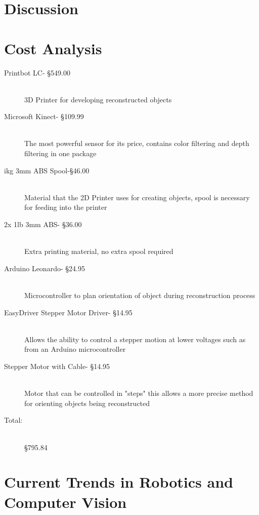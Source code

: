 \documentclass[12pt,twocolumn]{article}
\begin{document}
\section{Discussion}


\section{Cost Analysis}
  \begin{description}
  \item[Printbot LC- \S 549.00] \hfill \\
  3D Printer for developing reconstructed objects
  \item[Microsoft Kinect- \S 109.99] \hfill \\
  The most powerful sensor for its price, contains color filtering and depth filtering in one package
  \item[ikg 3mm ABS Spool-\S 46.00] \hfill \\
  Material that the 2D Printer uses for creating objects, spool is necessary for feeding into the printer
  \item[2x 1lb 3mm ABS- \S 36.00] \hfill \\
  Extra printing material, no extra spool required
  \item[Arduino Leonardo-  \S 24.95] \hfill \\
  Microcontroller to plan orientation of object during reconstruction process
  \item[EasyDriver Stepper Motor Driver- \S 14.95] \hfill \\
  Allows the ability to control a stepper motion at lower voltages such as from an Arduino microcontroller
  \item[Stepper Motor with Cable- \S 14.95] \hfill \\
  Motor that can be controlled in "steps" this allows a more precise method for orienting objects being reconstructed
  \item[Total:] \hfill \\
  \S 795.84
  \end{description}

\section{Current Trends in Robotics and Computer Vision}
\end{document}
